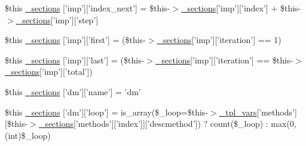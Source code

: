 \begin{DoxyCompactItemize}
\$this \hyperlink{default_234d6fa4bfd5eef6424a9ddc74a166350_2_06_06-14_05_06_06-1407541581_05method_8tpl_8php_ad57fc15b5046a45de3dc9c70dd74752d}{\-\_\-sections} \mbox{[}'imp'\mbox{]}\mbox{[}'index\-\_\-next'\mbox{]} = \$this-\/$>$\hyperlink{_06_06127_05_06_0612781687_05pkgelementindex_8tpl_8php_a9e3d26b39edfe29c3f29b8035ef33828}{\-\_\-sections}\mbox{[}'imp'\mbox{]}\mbox{[}'index'\mbox{]} + \$this-\/$>$\hyperlink{_06_06127_05_06_0612781687_05pkgelementindex_8tpl_8php_a9e3d26b39edfe29c3f29b8035ef33828}{\-\_\-sections}\mbox{[}'imp'\mbox{]}\mbox{[}'step'\mbox{]}
\item 
\$this \hyperlink{default_234d6fa4bfd5eef6424a9ddc74a166350_2_06_06-14_05_06_06-1407541581_05method_8tpl_8php_a944e6c7a585d4112ef30703091605a27}{\-\_\-sections} \mbox{[}'imp'\mbox{]}\mbox{[}'first'\mbox{]} = (\$this-\/$>$\hyperlink{_06_06127_05_06_0612781687_05pkgelementindex_8tpl_8php_a9e3d26b39edfe29c3f29b8035ef33828}{\-\_\-sections}\mbox{[}'imp'\mbox{]}\mbox{[}'iteration'\mbox{]} == 1)
\item 
\$this \hyperlink{default_234d6fa4bfd5eef6424a9ddc74a166350_2_06_06-14_05_06_06-1407541581_05method_8tpl_8php_acaf83940c87091008a81b9056a115eb5}{\-\_\-sections} \mbox{[}'imp'\mbox{]}\mbox{[}'last'\mbox{]} = (\$this-\/$>$\hyperlink{_06_06127_05_06_0612781687_05pkgelementindex_8tpl_8php_a9e3d26b39edfe29c3f29b8035ef33828}{\-\_\-sections}\mbox{[}'imp'\mbox{]}\mbox{[}'iteration'\mbox{]} == \$this-\/$>$\hyperlink{_06_06127_05_06_0612781687_05pkgelementindex_8tpl_8php_a9e3d26b39edfe29c3f29b8035ef33828}{\-\_\-sections}\mbox{[}'imp'\mbox{]}\mbox{[}'total'\mbox{]})
\item 
\$this \hyperlink{default_234d6fa4bfd5eef6424a9ddc74a166350_2_06_06-14_05_06_06-1407541581_05method_8tpl_8php_a11a68100da7056d041e5cd543be9a901}{\-\_\-sections} \mbox{[}'dm'\mbox{]}\mbox{[}'name'\mbox{]} = 'dm'
\item 
\$this \hyperlink{default_234d6fa4bfd5eef6424a9ddc74a166350_2_06_06-14_05_06_06-1407541581_05method_8tpl_8php_af28e4bf68d6d592fda7b7d1dc9540040}{\-\_\-sections} \mbox{[}'dm'\mbox{]}\mbox{[}'loop'\mbox{]} = is\-\_\-array(\$\-\_\-loop=\$this-\/$>$\hyperlink{_06_06127_05_06_0612781687_05pkgelementindex_8tpl_8php_a4a4846d8e68d455590131a05697f67a3}{\-\_\-tpl\-\_\-vars}\mbox{[}'methods'\mbox{]}\mbox{[}\$this-\/$>$\hyperlink{_06_06127_05_06_0612781687_05pkgelementindex_8tpl_8php_a9e3d26b39edfe29c3f29b8035ef33828}{\-\_\-sections}\mbox{[}'methods'\mbox{]}\mbox{[}'index'\mbox{]}\mbox{]}\mbox{[}'descmethod'\mbox{]}) ? count(\$\-\_\-loop) \-: max(0, (int)\$\-\_\-loop)
\item 

\end{DoxyCompactItemize}
